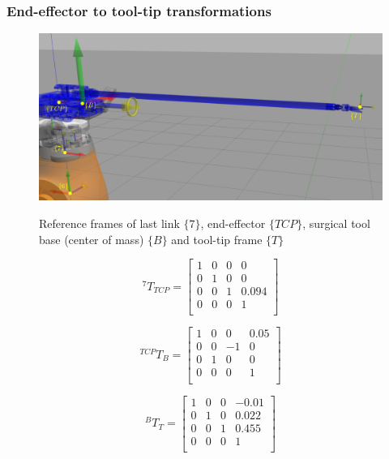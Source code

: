 \subsubsection{End-effector to tool-tip transformations}

\begin{center}
\begin{figure}[H]
\centering
\includegraphics[width=\textwidth]{images/eef_tcp_tip_tf.png}\\
\caption{Reference frames of last link $\lbrace 7 \rbrace$, end-effector $\lbrace TCP \rbrace$, surgical tool base (center of mass) $\lbrace B \rbrace$ and tool-tip frame $\lbrace T \rbrace$}
\end{figure}
\end{center}

\[
^{7}T_{TCP} = 
\begin{bmatrix}
1 & 0 & 0 & 0 \\
0 & 1 & 0 & 0 \\
0 & 0 & 1 & 0.094 \\
0 & 0 & 0 & 1 \\
\end{bmatrix}
\]

\[
^{TCP}T_{B} = 
\begin{bmatrix}
1 & 0 & 0 & 0.05 \\
0 & 0 & -1 & 0 \\
0 & 1 & 0 & 0 \\
0 & 0 & 0 & 1 \\
\end{bmatrix}
\]

\[
^{B}T_T = 
\begin{bmatrix}
1 & 0 & 0 & -0.01 \\
0 & 1 & 0 & 0.022 \\
0 & 0 & 1 & 0.455 \\
0 & 0 & 0 & 1 \\
\end{bmatrix}
\]


